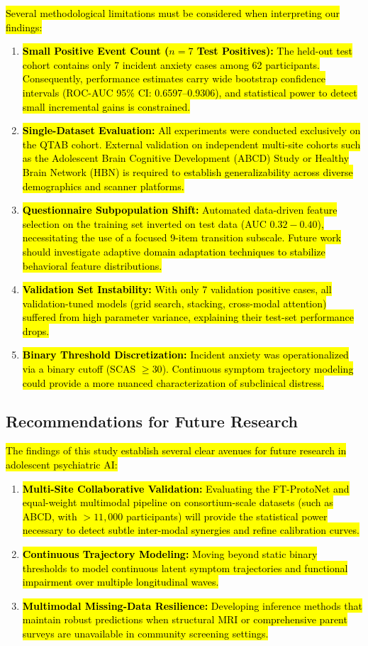 \documentclass[10pt,letterpaper]{article}
\begin{document}
\hl{Several methodological limitations must be considered when interpreting our findings:}
\begin{enumerate}
    \item \hl{\textbf{Small Positive Event Count ($n=7$ Test Positives):} The held-out test cohort contains only 7 incident anxiety cases among 62 participants. Consequently, performance estimates carry wide bootstrap confidence intervals (ROC-AUC 95\% CI: 0.6597--0.9306), and statistical power to detect small incremental gains is constrained.}
    \item \hl{\textbf{Single-Dataset Evaluation:} All experiments were conducted exclusively on the QTAB cohort. External validation on independent multi-site cohorts such as the Adolescent Brain Cognitive Development (ABCD) Study or Healthy Brain Network (HBN) is required to establish generalizability across diverse demographics and scanner platforms.}
    \item \hl{\textbf{Questionnaire Subpopulation Shift:} Automated data-driven feature selection on the training set inverted on test data (AUC $0.32-0.40$), necessitating the use of a focused 9-item transition subscale. Future work should investigate adaptive domain adaptation techniques to stabilize behavioral feature distributions.}
    \item \hl{\textbf{Validation Set Instability:} With only 7 validation positive cases, all validation-tuned models (grid search, stacking, cross-modal attention) suffered from high parameter variance, explaining their test-set performance drops.}
    \item \hl{\textbf{Binary Threshold Discretization:} Incident anxiety was operationalized via a binary cutoff (SCAS $\ge 30$). Continuous symptom trajectory modeling could provide a more nuanced characterization of subclinical distress.}
\end{enumerate}

\subsection*{Recommendations for Future Research}

\hl{The findings of this study establish several clear avenues for future research in adolescent psychiatric AI:}
\begin{enumerate}
    \item \hl{\textbf{Multi-Site Collaborative Validation:} Evaluating the FT-ProtoNet and equal-weight multimodal pipeline on consortium-scale datasets (such as ABCD, with $> 11{,}000$ participants) will provide the statistical power necessary to detect subtle inter-modal synergies and refine calibration curves.}
    \item \hl{\textbf{Continuous Trajectory Modeling:} Moving beyond static binary thresholds to model continuous latent symptom trajectories and functional impairment over multiple longitudinal waves.}
    \item \hl{\textbf{Multimodal Missing-Data Resilience:} Developing inference methods that maintain robust predictions when structural MRI or comprehensive parent surveys are unavailable in community screening settings.}
\end{enumerate}
\end{document}
